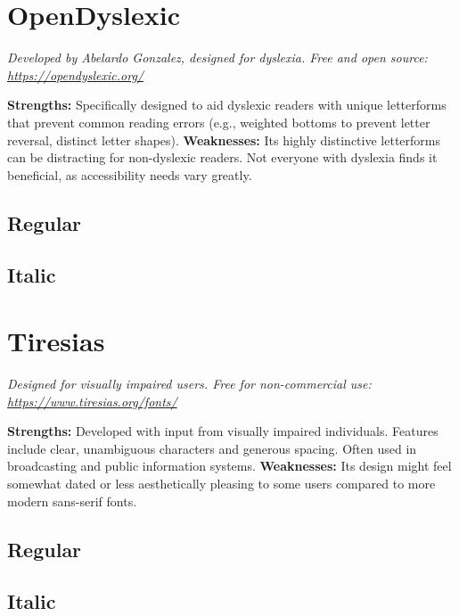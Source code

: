 \pagebreak
\section{OpenDyslexic}
\emph{Developed by Abelardo Gonzalez, designed for dyslexia. Free and open source: \url{https://opendyslexic.org/}}
\begin{raggedright}
\textbf{Strengths:} Specifically designed to aid dyslexic readers with unique letterforms that prevent common reading errors (e.g., weighted bottoms to prevent letter reversal, distinct letter shapes).
\textbf{Weaknesses:} Its highly distinctive letterforms can be distracting for non-dyslexic readers. Not everyone with dyslexia finds it beneficial, as accessibility needs vary greatly.

\subsection{Regular}
\FontSample{\opendyslexicfont}

\subsection{Italic}
\FontSample{{\opendyslexicfont\itshape}}
\end{raggedright}


\pagebreak
\section{Tiresias}
\emph{Designed for visually impaired users. Free for non-commercial use: \url{https://www.tiresias.org/fonts/}}
\begin{raggedright}
\textbf{Strengths:} Developed with input from visually impaired individuals. Features include clear, unambiguous characters and generous spacing. Often used in broadcasting and public information systems.
\textbf{Weaknesses:} Its design might feel somewhat dated or less aesthetically pleasing to some users compared to more modern sans-serif fonts.

\subsection{Regular}
\FontSample{\tiresiasfont}

\subsection{Italic}
\FontSample{{\tiresiasfont\itshape}}
\end{raggedright}


